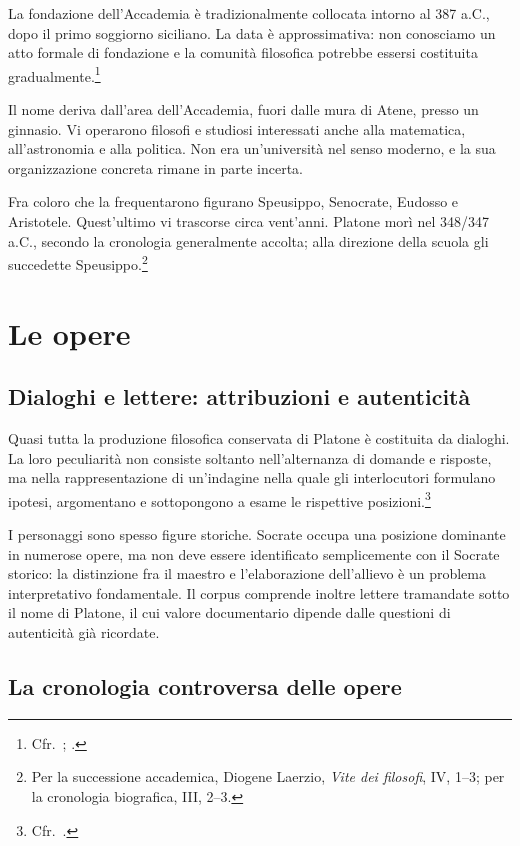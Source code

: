 La fondazione dell'Accademia è tradizionalmente collocata intorno al 387 a.C., dopo il primo soggiorno siciliano. La data è approssimativa: non conosciamo un atto formale di fondazione e la comunità filosofica potrebbe essersi costituita gradualmente.\footnote{Cfr.\ \cite[95]{palumbo2015}; \cite[cap.~5]{waterfield2023}.}

Il nome deriva dall'area dell'Accademia, fuori dalle mura di Atene, presso un ginnasio. Vi operarono filosofi e studiosi interessati anche alla matematica, all'astronomia e alla politica. Non era un'università nel senso moderno, e la sua organizzazione concreta rimane in parte incerta.

Fra coloro che la frequentarono figurano Speusippo, Senocrate, Eudosso e Aristotele. Quest'ultimo vi trascorse circa vent'anni. Platone morì nel 348/347 a.C., secondo la cronologia generalmente accolta; alla direzione della scuola gli succedette Speusippo.\footnote{Per la successione accademica, Diogene Laerzio, \emph{Vite dei filosofi}, IV, 1--3; per la cronologia biografica, III, 2--3.}

\section{Le opere}

\subsection{Dialoghi e lettere: attribuzioni e autenticità}

Quasi tutta la produzione filosofica conservata di Platone è costituita da dialoghi. La loro peculiarità non consiste soltanto nell'alternanza di domande e risposte, ma nella rappresentazione di un'indagine nella quale gli interlocutori formulano ipotesi, argomentano e sottopongono a esame le rispettive posizioni.\footnote{Cfr.\ \cite[95--98]{palumbo2015}.}

I personaggi sono spesso figure storiche. Socrate occupa una posizione dominante in numerose opere, ma non deve essere identificato semplicemente con il Socrate storico: la distinzione fra il maestro e l'elaborazione dell'allievo è un problema interpretativo fondamentale. Il corpus comprende inoltre lettere tramandate sotto il nome di Platone, il cui valore documentario dipende dalle questioni di autenticità già ricordate.

\subsection{La cronologia controversa delle opere}

